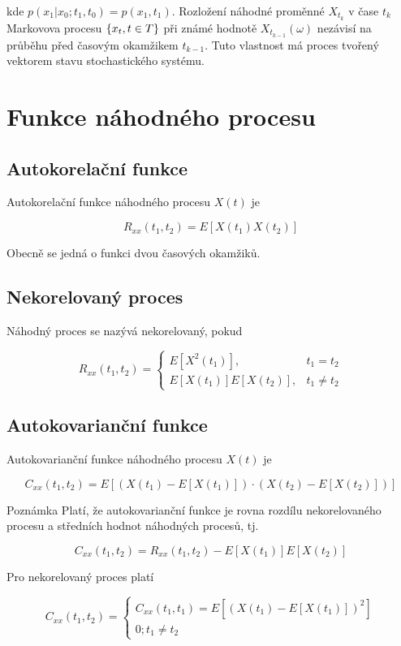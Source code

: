 kde $p(x_1|x_0;t_1,t_0)=p(x_1,t_1)$. Rozložení náhodné proměnné $X_{t_k}$ v čase $t_k$ Markovova procesu $\left\{x_t,t\in T\right\}$ při známé hodnotě $X_{t_{k-1}}(\omega)$ nezávisí na průběhu před časovým okamžikem $t_{k-1}$. Tuto vlastnost má proces tvořený vektorem stavu stochastického systému.


\section{Funkce náhodného procesu}
\subsection{Autokorelační funkce}
Autokorelační funkce náhodného procesu $X(t)$ je

\[ R_{xx}(t_1,t_2)=E[X(t_1)X(t_2)] \]

Obecně se jedná o funkci dvou časových okamžiků.

\subsection{Nekorelovaný proces}
Náhodný proces se nazývá nekorelovaný, pokud

\[
R_{xx}(t_1,t_2) =
\begin{cases}
	E[X^2(t_1)], & t_1=t_2\\
	E[X(t_1)]E[X(t_2)],&t_1\neq t_2
\end{cases}
\]

\subsection{Autokovarianční funkce}
Autokovarianční funkce náhodného procesu $X(t)$ je

\[ C_{xx}(t_1,t_2) = E[(X(t_1)-E[X(t_1)])\cdot (X(t_2)-E[X(t_2)])] \]

\begin{note}{Poznámka}
Platí, že autokovarianční funkce je rovna rozdílu nekorelovaného procesu a středních hodnot náhodných procesů, tj.

\[ C_{xx}(t_1,t_2) = R_{xx}(t_1,t_2) - E[X(t_1)]E[X(t_2)] \]
\end{note}

Pro nekorelovaný proces platí

\[
C_{xx}(t_1,t_2) =
\begin{cases}
	C_{xx}(t_1,t_1)=E[(X(t_1)-E[X(t_1)])^2]\\
	0; t_1\neq t_2
\end{cases}
\]


